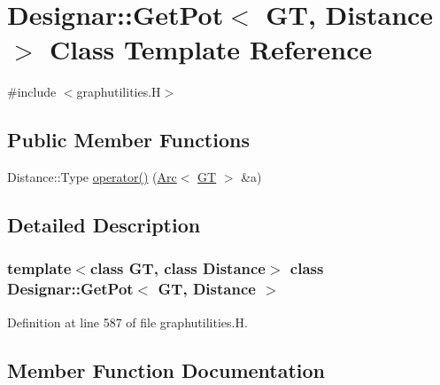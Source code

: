 \hypertarget{class_designar_1_1_get_pot}{}\section{Designar\+:\+:Get\+Pot$<$ GT, Distance $>$ Class Template Reference}
\label{class_designar_1_1_get_pot}


{\ttfamily \#include $<$graphutilities.\+H$>$}

\subsection*{Public Member Functions}
\begin{DoxyCompactItemize}
\item 
Distance\+::\+Type \hyperlink{class_designar_1_1_get_pot_a7f7a08b54b37d011ad4eb6a12cba94ec}{operator()} (\hyperlink{namespace_designar_a3f55fb5513d62ff47cbc8f72b8e95d6f}{Arc}$<$ \hyperlink{demo-buildgraph_8_c_a3001c40d2c31ca87ed96cd7d1334a55e}{GT} $>$ \&a)
\end{DoxyCompactItemize}


\subsection{Detailed Description}
\subsubsection*{template$<$class GT, class Distance$>$\newline
class Designar\+::\+Get\+Pot$<$ G\+T, Distance $>$}



Definition at line 587 of file graphutilities.\+H.



\subsection{Member Function Documentation}
\mbox{\label{class_designar_1_1_get_pot_a7f7a08b54b37d011ad4eb6a12cba94ec}} 
